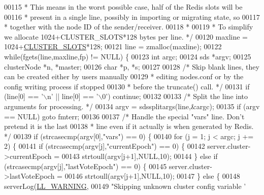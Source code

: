 \begin{DoxyCode}
{00115 \textcolor{comment}{     * This means in the worst possible case, half of the Redis slots will be}
00116 \textcolor{comment}{     * present in a single line, possibly in importing or migrating state, so}
00117 \textcolor{comment}{     * together with the node ID of the sender/receiver.}
00118 \textcolor{comment}{     *}
00119 \textcolor{comment}{     * To simplify we allocate 1024+CLUSTER\_SLOTS*128 bytes per line. */}
00120     maxline = 1024+\hyperlink{cluster_8h_aa3e2cb951eebb16725ecc3f5beefd9fd}{CLUSTER\_SLOTS}*128;
00121     line = zmalloc(maxline);
00122     \textcolor{keywordflow}{while}(fgets(line,maxline,fp) != NULL) \{
00123         \textcolor{keywordtype}{int} argc;
00124         sds *argv;
00125         clusterNode *n, *master;
00126         \textcolor{keywordtype}{char} *p, *s;
00127 
00128         \textcolor{comment}{/* Skip blank lines, they can be created either by users manually}
00129 \textcolor{comment}{         * editing nodes.conf or by the config writing process if stopped}
00130 \textcolor{comment}{         * before the truncate() call. */}
00131         \textcolor{keywordflow}{if} (line[0] == \textcolor{stringliteral}{'\(\backslash\)n'} || line[0] == \textcolor{stringliteral}{'\(\backslash\)0'}) \textcolor{keywordflow}{continue};
00132 
00133         \textcolor{comment}{/* Split the line into arguments for processing. */}
00134         argv = sdssplitargs(line,&argc);
00135         \textcolor{keywordflow}{if} (argv == NULL) \textcolor{keywordflow}{goto} fmterr;
00136 
00137         \textcolor{comment}{/* Handle the special "vars" line. Don't pretend it is the last}
00138 \textcolor{comment}{         * line even if it actually is when generated by Redis. */}
00139         \textcolor{keywordflow}{if} (strcasecmp(argv[0],\textcolor{stringliteral}{"vars"}) == 0) \{
00140             \textcolor{keywordflow}{for} (j = 1; j < argc; j += 2) \{
00141                 \textcolor{keywordflow}{if} (strcasecmp(argv[j],\textcolor{stringliteral}{"currentEpoch"}) == 0) \{
00142                     server.cluster->currentEpoch =
00143                             strtoull(argv[j+1],NULL,10);
00144                 \} \textcolor{keywordflow}{else} \textcolor{keywordflow}{if} (strcasecmp(argv[j],\textcolor{stringliteral}{"lastVoteEpoch"}) == 0) \{
00145                     server.cluster->lastVoteEpoch =
00146                             strtoull(argv[j+1],NULL,10);
00147                 \} \textcolor{keywordflow}{else} \{
00148                     serverLog(\hyperlink{server_8h_a31229b9334bba7d6be2a72970967a14b}{LL\_WARNING},
00149                         \textcolor{stringliteral}{"Skipping unknown cluster config variable '%
}}
\end{DoxyCode}
